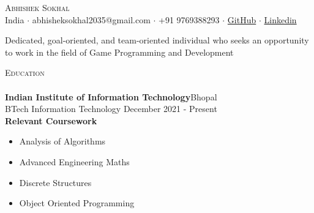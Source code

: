 \documentclass[a4paper]{article}
\newcommand{\lineunder} {
    \vspace*{-8pt} \\
    \hspace*{-18pt} \hrulefill \\
}
\newcommand{\header} [1] {
    {\hspace*{-18pt}\vspace*{6pt} \textsc{#1}}
    \vspace*{-6pt} \lineunder
}
\begin{document}
\vspace*{-40pt}

    

\vspace*{-9pt}
\begin{center}
	{\Huge \scshape {Abhishek Sokhal}}\\
	\vspace{2mm}
	India $\cdot$ abhisheksokhal2035@gmail.com $\cdot$ +91 9769388293 $\cdot$ \href{https://github.com/Distroto}{GitHub} $\cdot$ \href{https://www.linkedin.com/in/abhishek-sokhal-630a951ba/}{Linkedin} \\
\end{center}
\vspace{-5mm}
\begin{center}
Dedicated, goal-oriented, and team-oriented individual who seeks an opportunity to work in the field of Game Programming and Development\\
\end{center}
\vspace{-1mm}
\header{Education}
\vspace{0mm}
\textbf{Indian Institute of Information Technology}\hfill Bhopal\\
BTech Information Technology \hfill December 2021 - Present\\
\vspace{1mm}
\textbf{Relevant Coursework}
\vspace{-2.5mm}
 \begin{multicols}{2}
    \begin{itemize}
        \item Analysis of Algorithms
         \vspace{-2.5mm}
        \item Advanced Engineering Maths 
         \vspace{-2.5mm}
        \item Discrete Structures 
         \vspace{-2.5mm}
        \item Object Oriented Programming
         \vspace{-2.5mm}
        
    \end{itemize}
    \end{multicols}
\end{document}
